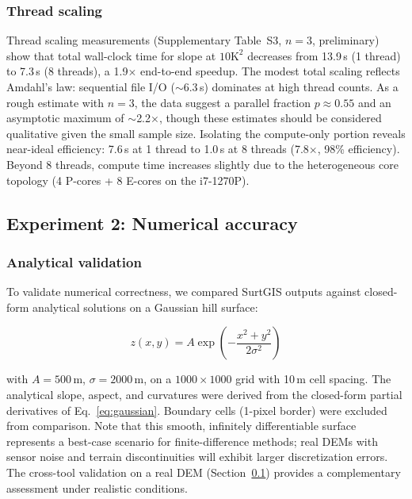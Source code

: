 \documentclass[preprint,review,12pt,authoryear]{elsarticle}
\begin{document}
\subsubsection{Thread scaling}

Thread scaling measurements (Supplementary Table~S3, $n=3$, preliminary) show that total wall-clock time for slope at $10\text{K}^2$ decreases from 13.9\,s (1 thread) to 7.3\,s (8 threads), a 1.9$\times$ end-to-end speedup. The modest total scaling reflects Amdahl's law: sequential file I/O ($\sim$6.3\,s) dominates at high thread counts. As a rough estimate with $n=3$, the data suggest a parallel fraction $p \approx 0.55$ and an asymptotic maximum of $\sim$2.2$\times$, though these estimates should be considered qualitative given the small sample size. Isolating the compute-only portion reveals near-ideal efficiency: 7.6\,s at 1 thread to 1.0\,s at 8 threads (7.8$\times$, 98\% efficiency). Beyond 8 threads, compute time increases slightly due to the heterogeneous core topology (4 P-cores + 8 E-cores on the i7-1270P).

\subsection{Experiment 2: Numerical accuracy}
\label{subsec:accuracy}

\subsubsection{Analytical validation}

To validate numerical correctness, we compared SurtGIS outputs against closed-form analytical solutions on a Gaussian hill surface:

\begin{equation}
z(x,y) = A \exp\!\left(-\frac{x^2 + y^2}{2\sigma^2}\right)
\label{eq:gaussian}
\end{equation}

\noindent with $A = 500$\,m, $\sigma = 2000$\,m, on a $1000 \times 1000$ grid with 10\,m cell spacing. The analytical slope, aspect, and curvatures were derived from the closed-form partial derivatives of Eq.~\ref{eq:gaussian}. Boundary cells (1-pixel border) were excluded from comparison. Note that this smooth, infinitely differentiable surface represents a best-case scenario for finite-difference methods; real DEMs with sensor noise and terrain discontinuities will exhibit larger discretization errors. The cross-tool validation on a real DEM (Section~\ref{subsec:accuracy}) provides a complementary assessment under realistic conditions.
\end{document}
